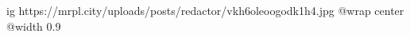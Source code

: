  
 
 
 
 

\ifcmt
  ig https://mrpl.city/uploads/posts/redactor/vkh6oleoogodk1h4.jpg
  @wrap center
  @width 0.9
\fi
